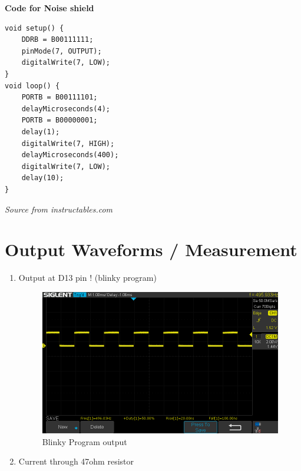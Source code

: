 \documentclass[a4paper,11pt]{article}%
\begin{document}
\textbf{Code for Noise shield}

\begin{lstlisting}
void setup() {
	DDRB = B00111111;
	pinMode(7, OUTPUT);
	digitalWrite(7, LOW);
}
void loop() {
	PORTB = B00111101;
	delayMicroseconds(4);
	PORTB = B00000001;
	delay(1);
	digitalWrite(7, HIGH);
	delayMicroseconds(400);
	digitalWrite(7, LOW);
	delay(10);
}
	\end{lstlisting}





\textit{Source from instructables.com}


\section{Output Waveforms / Measurement}
\begin{enumerate}
	\item Output at D13 pin ! (blinky program)
	      \begin{figure}[H]
		      \centering
		      \includegraphics[scale=0.6]{figures/output.png}
		      \caption{Blinky Program output}
	      \end{figure}
	\item Current through 47ohm resistor
	      \begin{itemize}


\end{itemize}
\end{enumerate}
\end{document}
